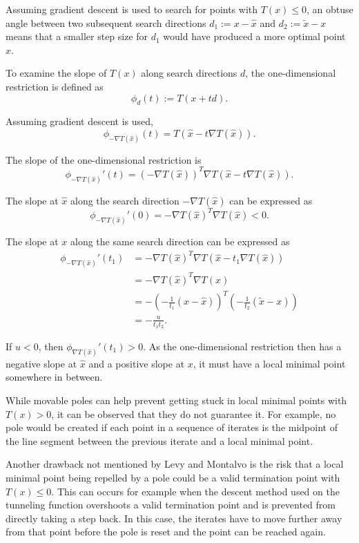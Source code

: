 \documentclass[a4paper,12pt,twoside]{article}
\begin{document}
Assuming gradient descent is used to search for points with $T(x) \leq 0$, an obtuse angle between two subsequent search directions $d_1 := x - \hat x$ and $d_2 := \tilde x - x$ means that a smaller step size for $d_1$ would have produced a more optimal point $x$. 

To examine the slope of $T(x)$ along search directions $d$, the one-dimensional restriction is defined as
\[
\phi_d(t) := T(x+td).
\]

Assuming gradient descent is used,
\[
\phi_{-\nabla T(\hat x)}(t) = T(\hat x - t \nabla T(\hat x)).
\]

The slope of the one-dimensional restriction is
\[
\phi_{-\nabla T(\hat x)}'(t) = (-\nabla T(\hat x))^T \nabla T(\hat x - t  \nabla T(\hat x)).
\]

The slope at $\hat x$ along the search direction $-\nabla T(\hat x)$ can be expressed as
\[
\phi_{-\nabla T(\hat x)}'(0) = -\nabla T(\hat x)^T \nabla T(\hat x) < 0.
\]

The slope at $x$ along the same search direction can be expressed as 
\begin{align*}
\phi_{-\nabla T(\hat x)}'(t_1) &= -\nabla T(\hat x)^T \nabla T(\hat x - t_1 \nabla T(\hat x)) \\
&= -\nabla T(\hat x)^T \nabla T(x) \\
&= - \left( -\frac{1}{t_1}(x-\hat x) \right) ^T \left( -\frac{1}{t_2} (\tilde x - x) \right) \\
&= -\frac{u}{t_1t_2}.
\end{align*}

If $u < 0$, then $\phi_{\nabla T(\hat x)}'(t_1) > 0$. As the one-dimensional restriction then has a negative slope at $\hat x$ and a positive slope at $x$, it must have a local minimal point somewhere in between. 

While movable poles can help prevent getting stuck in local minimal points with $T(x) > 0$, it can be observed that they do not guarantee it. For example, no pole would be created if each point in a sequence of iterates is the midpoint of the line segment between the previous iterate and a local minimal point. 

Another drawback not mentioned by Levy and Montalvo is the risk that a local minimal point being repelled by a pole could be a valid termination point with $T(x) \leq 0$. This can occurs for example when the descent method used on the tunneling function overshoots a valid termination point and is prevented from directly taking a step back. In this case, the iterates have to move further away from that point before the pole is reset and the point can be reached again.
\end{document}
